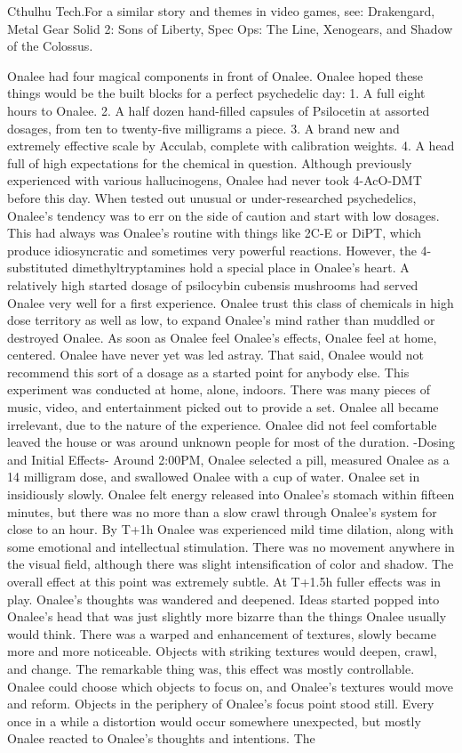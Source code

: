 \documentclass[12pt]{book}
\begin{document}
Cthulhu Tech.For a similar story and themes in video games, see: Drakengard, Metal Gear Solid 2: Sons of Liberty, Spec Ops: The Line, Xenogears, and Shadow of the Colossus.



Onalee had four magical components in front of Onalee. Onalee hoped these things would be the built blocks for a perfect psychedelic day: 1. A full eight hours to Onalee. 2. A half dozen hand-filled capsules of Psilocetin at assorted dosages, from ten to twenty-five milligrams a piece. 3. A brand new and extremely effective scale by Acculab, complete with calibration weights. 4. A head full of high expectations for the chemical in question. Although previously experienced with various hallucinogens, Onalee had never took 4-AcO-DMT before this day. When tested out unusual or under-researched psychedelics, Onalee's tendency was to err on the side of caution and start with low dosages. This had always was Onalee's routine with things like 2C-E or DiPT, which produce idiosyncratic and sometimes very powerful reactions. However, the 4-substituted dimethyltryptamines hold a special place in Onalee's heart. A relatively high started dosage of psilocybin cubensis mushrooms had served Onalee very well for a first experience. Onalee trust this class of chemicals in high dose territory as well as low, to expand Onalee's mind rather than muddled or destroyed Onalee. As soon as Onalee feel Onalee's effects, Onalee feel at home, centered. Onalee have never yet was led astray. That said, Onalee would not recommend this sort of a dosage as a started point for anybody else. This experiment was conducted at home, alone, indoors. There was many pieces of music, video, and entertainment picked out to provide a set. Onalee all became irrelevant, due to the nature of the experience. Onalee did not feel comfortable leaved the house or was around unknown people for most of the duration. -Dosing and Initial Effects- Around 2:00PM, Onalee selected a pill, measured Onalee as a 14 milligram dose, and swallowed Onalee with a cup of water. Onalee set in insidiously slowly. Onalee felt energy released into Onalee's stomach within fifteen minutes, but there was no more than a slow crawl through Onalee's system for close to an hour. By T+1h Onalee was experienced mild time dilation, along with some emotional and intellectual stimulation. There was no movement anywhere in the visual field, although there was slight intensification of color and shadow. The overall effect at this point was extremely subtle. At T+1.5h fuller effects was in play. Onalee's thoughts was wandered and deepened. Ideas started popped into Onalee's head that was just slightly more bizarre than the things Onalee usually would think. There was a warped and enhancement of textures, slowly became more and more noticeable. Objects with striking textures would deepen, crawl, and change. The remarkable thing was, this effect was mostly controllable. Onalee could choose which objects to focus on, and Onalee's textures would move and reform. Objects in the periphery of Onalee's focus point stood still. Every once in a while a distortion would occur somewhere unexpected, but mostly Onalee reacted to Onalee's thoughts and intentions. The 
\end{document}
